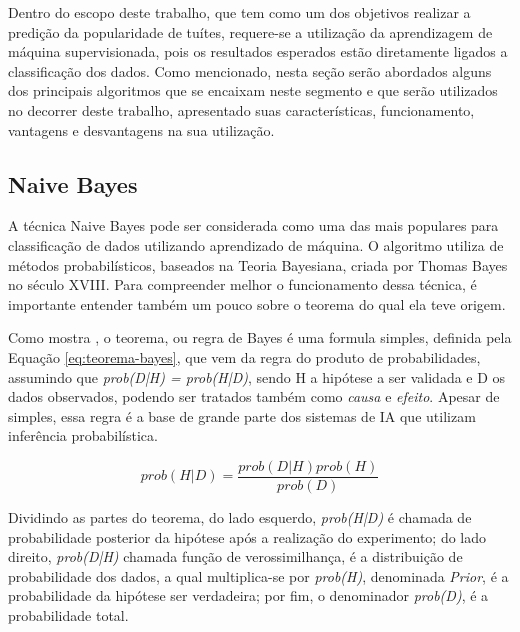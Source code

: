 \documentclass[oneside,openright,12pt]{ufsm_2015} %
\begin{document}
\par Dentro do escopo deste trabalho, que tem como um dos objetivos realizar a predição da popularidade de tuítes, requere-se a utilização da aprendizagem de máquina supervisionada, pois os resultados esperados estão diretamente ligados a classificação dos dados. Como mencionado, nesta seção serão abordados alguns dos principais algoritmos que se encaixam neste segmento e que serão utilizados no decorrer deste trabalho, apresentado suas características, funcionamento, vantagens e desvantagens na sua utilização.


\subsection{Naive Bayes}
\label{sec:naive-bayes}

\par A técnica Naive Bayes pode ser considerada como uma das mais populares para classificação de dados utilizando aprendizado de máquina. O algoritmo utiliza de métodos probabilísticos, baseados na Teoria Bayesiana, criada por Thomas Bayes no século XVIII. Para compreender melhor o funcionamento dessa técnica, é importante entender também um pouco sobre o teorema do qual ela teve origem.

\par Como mostra \cite{book:russell:10}, o teorema, ou regra de Bayes é uma formula simples, definida pela Equação \ref{eq:teorema-bayes}, que vem da regra do produto de probabilidades, assumindo que \textit{prob(D|H) = prob(H|D)}, sendo H a hipótese a ser validada e D os dados observados, podendo ser tratados também como \textit{causa} e \textit{efeito}. Apesar de simples, essa regra é a base de grande parte dos sistemas de IA que utilizam inferência probabilística.
    
\begin{equation} \label{eq:teorema-bayes}
prob(H|D) = \frac{prob(D|H)prob(H)}{prob(D)}
\end{equation}

\par Dividindo as partes do teorema, do lado esquerdo, \textit{prob(H|D)} é chamada de probabilidade posterior da hipótese após a realização do experimento; do lado direito, \textit{prob(D|H)} chamada função de verossimilhança, é a distribuição de probabilidade dos dados, a qual multiplica-se por \textit{prob(H)}, denominada \textit{Prior}, é a probabilidade da hipótese ser verdadeira; por fim, o denominador \textit{prob(D)}, é a probabilidade total.
\end{document}
